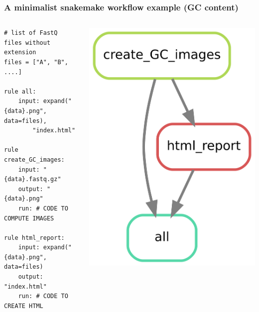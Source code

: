 \documentclass{beamer}
\begin{document}
\begin{frame}[fragile]
\frametitle{A minimalist snakemake workflow example (GC content)}
\centering

\begin{columns}
 \begin{column}{7.2cm}
 \hspace{-2cm}
\begin{lstlisting}
# list of FastQ files without extension
files = ["A", "B", ....]

rule all:
    input: expand("{data}.png", data=files), 
        "index.html"

rule create_GC_images:
    input: "{data}.fastq.gz"
    output: "{data}.png"
    run: # CODE TO COMPUTE IMAGES
        
rule html_report:
    input: expand("{data}.png", data=files)
    output: "index.html"
    run: # CODE TO CREATE HTML 
\end{lstlisting} 
\end{column}
\begin{column}{3.9cm}
\hspace{1cm}
 \includegraphics[scale=2.2]{./images/gc.png}
\end{column}
\end{columns}
\end{frame}
\end{document}
